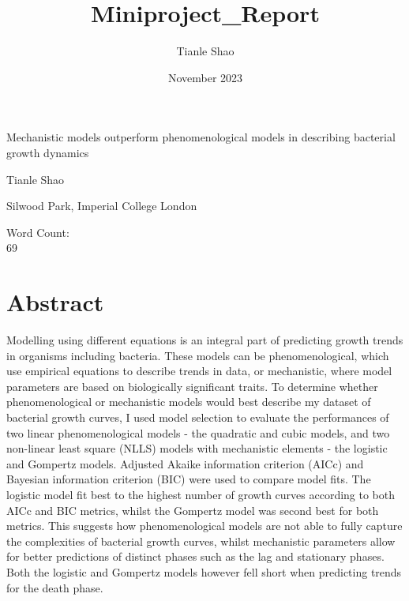 \documentclass[11pt, letterpaper]{article}
\title{Miniproject_Report}
\author{Tianle Shao}
\date{November 2023}
\begin{document}
\begin{titlepage}
    \vspace*{3cm}
    \centering
    \Huge
    Mechanistic models outperform phenomenological models in describing bacterial growth dynamics
    
    \vspace{1.5cm} %
    
    \Large
    Tianle Shao \\

    \vspace{0.5cm}
    
    Silwood Park, Imperial College London
    
    \vspace{3cm} %

    Word Count: \\
    69
    
    
\end{titlepage}

\linenumbers
\onehalfspacing
\section{Abstract} %
Modelling using different equations is an integral part of predicting growth trends in organisms including bacteria. These models can be phenomenological, which use empirical equations to describe trends in data, or mechanistic, where model parameters are based on biologically significant traits.
To determine whether phenomenological or mechanistic models would best describe my dataset of bacterial growth curves, I used model selection to evaluate the performances of two linear phenomenological models - the quadratic and cubic models, and two non-linear least square (NLLS) models with mechanistic elements - the logistic and Gompertz models. Adjusted Akaike information criterion (AICc) and Bayesian information criterion (BIC) were used to compare model fits.
The logistic model fit best to the highest number of growth curves according to both AICc and BIC metrics, whilst the Gompertz model was second best for both metrics.
This suggests how phenomenological models are not able to fully capture the complexities of bacterial growth curves, whilst mechanistic parameters allow for better predictions of distinct phases such as the lag and stationary phases. Both the logistic and Gompertz models however fell short when predicting trends for the death phase.
\end{document}
